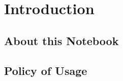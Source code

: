 
\chapter{Introduction}
\label{chapter1}

\section{About this Notebook}
\label{section1.1}

\section{Policy of Usage}
\label{section1.2}
